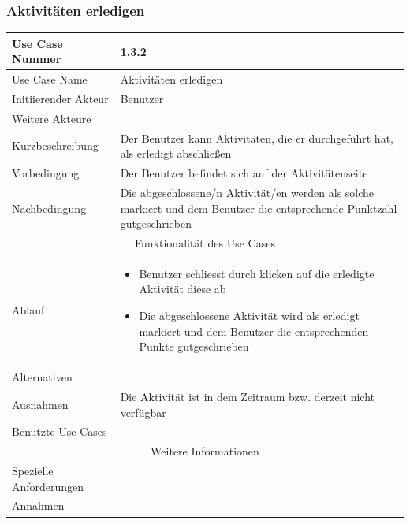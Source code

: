 \documentclass[10pt,a4paper]{article}
\begin{document}
	\subsubsection{Aktivit\"aten erledigen}
	\begin{tabular}{|l|p{.5\linewidth}|}
	\hline Use Case Nummer & 1.3.2\\ 
	\hline Use Case Name & Aktivit\"aten erledigen \\ 
	\hline Initiierender Akteur & Benutzer \\
	\hline Weitere Akteure & \\
	\hline Kurzbeschreibung & Der Benutzer kann Aktivit\"aten, die er durchgef\"uhrt hat, als erledigt abschließen \\
	\hline Vorbedingung & Der Benutzer befindet sich auf der Aktivit\"atenseite \\
	\hline Nachbedingung & Die abgeschlossene/n Aktivit\"at/en werden als solche markiert und dem Benutzer die entsprechende Punktzahl gutgeschrieben \\
	\hline \multicolumn{2}{|c|}{Funktionalität des Use Cases}\\
	\hline Ablauf & \begin{itemize}
			\item Benutzer schliesst durch klicken auf die erledigte Aktivit\"at diese ab
			\item Die abgeschlossene Aktivit\"at wird als erledigt markiert und dem Benutzer die entsprechenden Punkte gutgeschrieben
		\end{itemize} \\
	\hline Alternativen & \\
	\hline Ausnahmen & Die Aktivit\"at ist in dem Zeitraum bzw. derzeit nicht verf\"ugbar \\
	\hline Benutzte Use Cases &  \\
	\hline \multicolumn{2}{|c|}{Weitere Informationen} \\
	\hline Spezielle Anforderungen & \\
	\hline Annahmen & \\
	\hline
	\end{tabular} 
\end{document}
